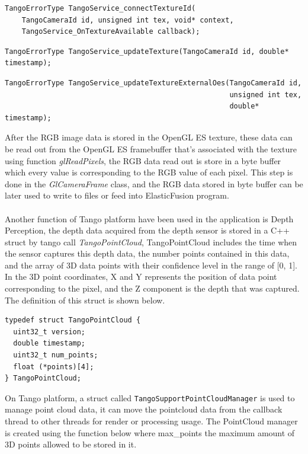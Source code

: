 \documentclass[12pt,twoside]{article}
\begin{document}
\begin{lstlisting}
TangoErrorType TangoService_connectTextureId(
    TangoCameraId id, unsigned int tex, void* context,
    TangoService_OnTextureAvailable callback);
\end{lstlisting}
\begin{lstlisting}
TangoErrorType TangoService_updateTexture(TangoCameraId id, double* timestamp);
\end{lstlisting}
\begin{lstlisting}
TangoErrorType TangoService_updateTextureExternalOes(TangoCameraId id,
                                                     unsigned int tex,
                                                     double* timestamp);
\end{lstlisting}
After the RGB image data is stored in the OpenGL ES texture, these data can be read out from the OpenGL ES framebuffer that's associated with the texture using function \textit{glReadPixels}, the RGB data read out is store in a byte buffer which every value is corresponding to the RGB value of each pixel. This step is done in the \textit{GlCameraFrame} class, and the RGB data stored in byte buffer can be later used to write to files or feed into ElasticFusion program.\\
\\
Another function of Tango platform have been used in the application is Depth Perception, the depth data acquired from the depth sensor is stored in a C++ struct by tango call \textit{TangoPointCloud}, TangoPointCloud includes the time when the sensor captures this depth data, the number points contained in this data, and the array of 3D data points with their confidence level in the range of [0, 1]. In the 3D point coordinates, X and Y represents the position of data point corresponding to the pixel, and the Z component is the depth that was captured. The definition of this struct is shown below.\\
\begin{lstlisting}
typedef struct TangoPointCloud {
  uint32_t version;
  double timestamp;
  uint32_t num_points;
  float (*points)[4];
} TangoPointCloud;
\end{lstlisting}
On Tango platform, a struct called \verb|TangoSupportPointCloudManager| is used to manage point cloud data, it can move the pointcloud data from the callback thread to other threads for render or processing usage. The PointCloud manager is created using the function below where max\_points the maximum amount of 3D points allowed to be stored in it.\\
\end{document}

